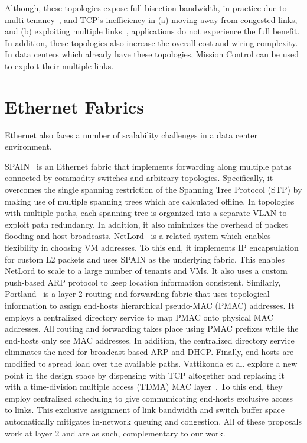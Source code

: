 \documentclass[a4paper,12pt,twoside,openright]{report}
\begin{document}
Although, these topologies expose full bisection bandwidth, in practice due to
multi-tenancy~\cite{Costa:2012:CEI}, and TCP's inefficiency in (a) moving away
from congested links, and (b) exploiting multiple links~\cite{Raiciu:2011:IDP},
applications do not experience the full benefit. In addition, these topologies
also increase the overall cost and wiring complexity. In data centers which
already have these topologies, Mission Control can be used to exploit their
multiple links. 

\section{Ethernet Fabrics}
Ethernet also faces a number of scalability challenges in a data center
environment. 

SPAIN~\cite{Mudigonda:2010:SCD} is an Ethernet fabric that implements forwarding
along multiple paths connected by commodity switches and arbitrary topologies.
Specifically, it overcomes the single spanning restriction of the Spanning Tree
Protocol (STP) by making use of multiple spanning trees which are calculated
offline. In topologies with multiple paths, each spanning tree is organized into
a separate VLAN to exploit path redundancy. In addition, it also minimizes the
overhead of packet flooding and host broadcasts.
NetLord~\cite{Mudigonda:2011:NSM} is a related system which enables flexibility
in choosing VM addresses. To this end, it implements IP encapsulation for custom
L2 packets and uses SPAIN as the underlying fabric. This enables NetLord to
scale to a large number of tenants and VMs. It also uses a custom push-based ARP
protocol to keep location information consistent. Similarly,
Portland~\cite{NiranjanMysore:2009:PSF} is a layer 2 routing and forwarding
fabric that uses topological information to assign end-hosts hierarchical
pseudo-MAC (PMAC) addresses. It employs a centralized directory service to map
PMAC onto physical MAC addresses. All routing and forwarding takes place using
PMAC prefixes while the end-hosts only see MAC addresses. In addition, the
centralized directory service eliminates the need for broadcast based ARP and
DHCP. Finally, end-hosts are modified to spread load over the available paths.
Vattikonda et al. explore a new point in the design space by dispensing with TCP
altogether and replacing it with a time-division multiple access (TDMA) MAC
layer~\cite{Vattikonda:2012:PTD}. To this end, they employ centralized
scheduling to give communicating end-hosts exclusive access to links. This
exclusive assignment of link bandwidth and switch buffer space automatically
mitigates in-network queuing and congestion. All of these proposals work at
layer 2 and are as such, complementary to our work.
\end{document}

